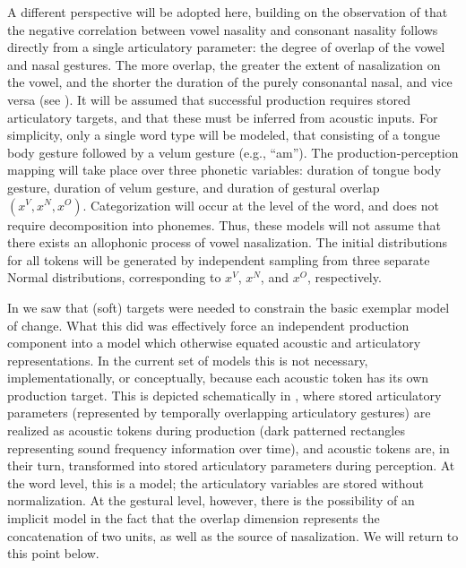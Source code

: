 A different perspective will be adopted here, building on the observation
of \citet{Beddor2009} that the negative correlation between vowel
nasality and consonant nasality follows directly from a single articulatory
parameter: the degree of overlap of the vowel and nasal gestures.
The more overlap, the greater the extent of nasalization on the vowel,
and the shorter the duration of the purely consonantal nasal, and
vice versa (see ). It will be assumed
that successful production requires stored articulatory targets, and
that these must be inferred from acoustic inputs. For simplicity,
only a single word type will be modeled, that consisting of a tongue
body gesture followed by a velum gesture (e.g., “am”). The production-perception
mapping will take place over three phonetic variables: duration of
tongue body gesture, duration of velum gesture, and duration of gestural
overlap $(x^{V},x^{N},x^{O})$. Categorization will occur at the level
of the word, and does not require decomposition into phonemes. Thus,
these models will not assume that there exists an allophonic process
of vowel nasalization. The initial distributions for all tokens will
be generated by independent sampling from three separate Normal distributions,
corresponding to $x^{V}$, $x^{N}$, and $x^{O}$, respectively. 

In  we saw that (soft) targets
were needed to constrain the basic exemplar model of change. What
this did was effectively force an independent production component
into a model which otherwise equated acoustic and articulatory representations.
In the current set of models this is not necessary, implementationally,
or conceptually, because each acoustic token has its own production
target. This is depicted schematically in ,
where stored articulatory parameters (represented by temporally overlapping
articulatory gestures) are realized as acoustic tokens during production
(dark patterned rectangles representing sound frequency information
over time), and acoustic tokens are, in their turn, transformed into
stored articulatory parameters during perception. At the word level,
this is a  model; the articulatory variables are stored
without normalization. At the gestural level, however, there is the
possibility of an implicit  model in the fact that the
overlap dimension represents the concatenation of two units, as well
as the source of nasalization. We will return to this point below.

